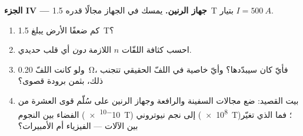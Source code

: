 \begin{problem}
\medskip
\noindent\textbf{الجزء IV --- جهاز الرنين.}
يمسك  في الجهاز مجالًا  قدره \qty{1.5}{T} بتيار
$I = \qty{500}{A}$.
\begin{enumerate}[resume]
  \item كم ضعفًا  الأرض يبلغ \qty{1.5}{T}؟
  \item احسب كثافة اللفّات $n$ اللازمة \emph{دون} أي قلب حديدي.
  \item ولو كانت  اللفّ \qty{0.20}{\ohm}، فأيّ 
        كان سيبدّدها؟ وأيّ خاصية في اللفّ الحقيقي تتجنب
        ذلك، بثمن برودة قصوى؟
  \item بيت القصيد: ضع مجالات السفينة والرافعة وجهاز الرنين
        على سُلّم قوى العشرة من الفضاء بين النجوم
        (\qty{e-10}{T}) إلى نجم نيوتروني (\qty{e8}{T})؛ فما الذي تغيّر
        بين الآلات --- الفيزياء أم الأمبيرات؟
\end{enumerate}
\end{problem}
